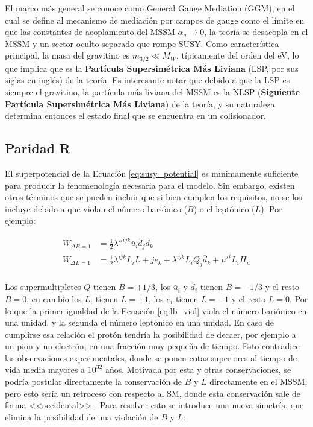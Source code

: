 El marco más general se conoce como General Gauge Mediation (GGM), en el
cual se define al mecanismo de mediación por campos de gauge como el límite en
que las constantes de acoplamiento del MSSM $\alpha_a\to 0$, la teoría se desacopla en el
MSSM y un sector oculto separado que rompe SUSY. Como característica principal, la masa del
gravitino es $m_{3/2} \ll M_W$, típicamente del orden del eV, lo que implica que es la \textbf{Partícula Supersimétrica Más Liviana} (LSP, por sus siglas en inglés) 
de la teoría. Es interesante notar que debido a que la LSP es siempre el gravitino, la
partícula más liviana del MSSM es la NLSP (\textbf{Siguiente Partícula Supersimétrica Más Liviana}) de la teoría, y su naturaleza determina
entonces el estado final que se encuentra en un colisionador.

\subsection{Paridad R}

El superpotencial de la Ecuación \ref{eq:susy_potential} es mínimamente suficiente para producir la fenomenología necesaria para el modelo. Sin embargo, existen otros términos que se pueden incluir que si bien cumplen los requisitos, no se los incluye debido a que violan el número bariónico ($B$) o el leptónico ($L$). Por ejemplo:

\begin{equation}
	\begin{split}
		W_{\Delta B = 1} & = \frac{1}{2}\lambda ''^{ijk}\bar{u}_i\bar{d}_j\bar{d}_k \\
		W_{\Delta L = 1} & = \frac{1}{2}\lambda^{ijk}L_iL+j\bar{e}_k + \lambda^{ijk}L_iQ_j\bar{d}_k + \mu '^{i}L_i H_u \\
	\end{split}
	\label{eq:lb_viol}
\end{equation}

Los supermultipletes $Q$ tienen $B=+1/3$, los $\bar{u}_i$ y $\bar{d}_i$ tienen $B=-1/3$ y el resto $B=0$, en cambio los $L_i$ tienen $L=+1$, los $\bar{e}_i$ tienen $L=-1$ y el resto $L=0$. Por lo que la primer igualdad de la Ecuación \ref{eq:lb_viol} viola el número bariónico en una unidad, y la segunda el número leptónico en una unidad. En caso de cumplirse esa relación el protón tendría la posibilidad de decaer, por ejemplo a un pion y un electrón, en una fracción muy pequeña de tiempo. Esto contradice las observaciones experimentales, donde se ponen cotas superiores al tiempo de vida media mayores a $10^{32}$ años. Motivada por esta y otras conservaciones, se podría postular directamente la conservación de $B$ y $L$ directamente en el MSSM, pero esto sería un retroceso con respecto al SM, donde esta conservación sale de forma 
<<accidental>>
. Para resolver esto se introduce una nueva simetría, que elimina la posibilidad de una violación de $B$ y $L$:

